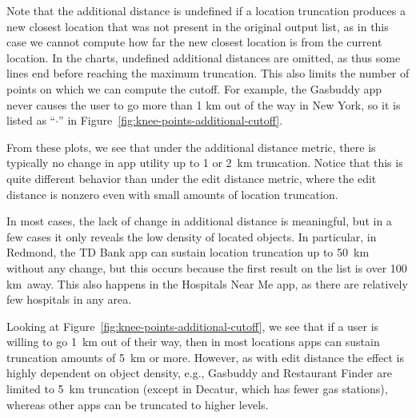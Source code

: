 \documentclass[10pt, conference, compsocconf]{IEEEtran}
\newcommand{\comment}[3][\color{red}]{{#1{[{#2}: {#3}]}}}
\newcommand{\jeff}[1]{\comment[\color{green}]{JSF}{#1}}
\begin{document}
Note that the additional distance is undefined if a location
truncation produces a new closest location that was not present in the
original output list, as in this case we cannot compute how far the
new closest location is from the current location. In the charts,
undefined additional distances are omitted, as thus some lines end
before reaching the maximum truncation. This also limits the number of
points on which we can compute the cutoff.  For example, the Gasbuddy
app never causes the user to go more than 1 km out of the way in New York, 
so it is listed as ``$\cdot$'' in Figure~\ref{fig:knee-points-additional-cutoff}.

From these plots, we see that under the additional distance
metric, there is typically no change in app utility up to 1 or 2~km
truncation. Notice that this is
quite different behavior than under the edit distance metric,
where the edit distance is nonzero even with small amounts of 
location truncation.


In most cases, the lack of change in additional distance is
meaningful, but in a few cases it only reveals the low density of
located objects. In particular, in Redmond, the TD Bank app can
sustain location truncation up to 50~km without any change, but
this occurs because the first result on the list is over 100 km~away. This
also happens in the Hospitals Near Me app, as there are relatively few
hospitals in any area.

Looking at Figure~\ref{fig:knee-points-additional-cutoff}, we see that
if a user is willing to go 1~km out of their way, then in most
locations apps can sustain truncation amounts of 5~km or
more. However, as with edit distance the effect is highly dependent on
object density, e.g., Gasbuddy and Restaurant Finder are limited to 5~km
truncation (except in Decatur, which has fewer gas
stations), whereas other apps can be truncated to higher levels.


\end{document}
